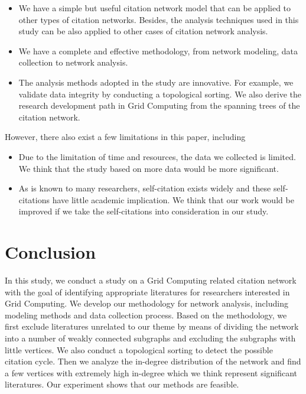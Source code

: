 \begin {itemize}
\item We have a simple but useful citation network model that can be applied to other types of citation networks. Besides, the analysis techniques used in this study can be also applied to other cases of citation network analysis.
\item We have a complete and effective methodology, from network modeling, data collection to network analysis.
\item The analysis methods adopted in the study are innovative. For example, we validate data integrity by conducting a topological sorting. We also derive the research development path in Grid Computing from the spanning trees of the citation network.
\end {itemize}

However, there also exist a few limitations in this paper, including 

\begin{itemize}
\item Due to the limitation of time and resources, the data we collected is limited. We think that the study based on more data would be more significant.
\item As is known to many researchers, self-citation exists widely and these self-citations have little academic implication. We think that our work would be improved if we take the self-citations into consideration in our study.
\end{itemize} 


\section{Conclusion \label{S:Conclusion} }
In this study, we conduct a study on a Grid Computing related citation network with the goal of identifying appropriate literatures for researchers interested in Grid Computing. We develop our methodology for network analysis, including modeling methods and data collection process. Based on the methodology, we first exclude literatures unrelated to our theme by means of  dividing the network into a number of weakly connected subgraphs and excluding the subgraphs with little vertices. We also conduct a topological sorting to detect the possible citation cycle. Then we analyze the in-degree distribution of the network and find a few vertices with extremely high in-degree which we think represent significant literatures. Our experiment shows that our methods are feasible.
